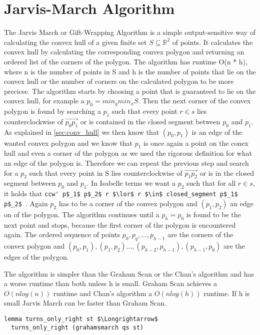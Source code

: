 




\section{Jarvis-March Algorithm}
The Jarvis March or Gift-Wrapping Algorithm is a simple output-sensitive way of calculating
the convex hull of a given finite set $S \subseteq \mathbb{R}^2$ of points. It calculates the
convex hull by calculating the corresponding convex polygon and returning
an ordered list of the corners of the polygon. The algorithm has runtime O(n * h), where n 
is the number of points in S and h is the number of points that lie on the convex hull or
the number of corners on the calculated polygon to be more precicse. 
The algorithm starts by choosing a point that is guaranteed to lie on the convex hull, 
for example a $p_0 = min_y min_x S$. Then the next corner of the convex polygon
is found by searching a $p_1$ such that every point $r \in s$ lies counterclockwise
of $\vec{p_0 p_1}$ or is contained in the closed segment between $p_0$ and $p_1$. 
As explained in \ref{sec:conv_hull} we then know that $(p_0,p_1)$ is 
an edge of the wanted convex polygon and we know that $p_1$ is once again a point on
the conex hull and even a corner of the polygon as we used the rigorous definition for
what an edge of the polygon is. Therefore we can repeat the previous step
and search for a $p_2$ such that every point in S lies counterclockwise of $\vec{p_1 p_2}$
or is in the closed segment between $p_0$ and $p_1$. In Isabelle terms we want a $p_2$
such that for all $r \in s$, it holds that 
\lstinline|ccw' p$_1$ p$_2$ r $\lor$ r $\in$ closed_segment p$_1$ p$_2$ |.
Again $p_2$ has to be a corner of the convex polygon and $(p_1,p_2)$ an edge on of the
polygon. The algorithm continues until a $p_h = p_0$ is found to be the next point and
stops, because the first corner of the polygon is encountered again. 
The ordered sequence of points $p_0,p_q, ... , p_{h-1}$ are the corners of the convex polygon 
and $(p_0,p_1),(p_1,p_2) ... ,(p_{h-2},p_{h-1}), (p_{h-1},p_0)$ are the edges of the polygon.

The algorithm is simpler than the Graham Scan or the Chan's algorithm and has a worse
runtime than both unless h is small. Graham Scan achieves a $O(n log(n))$ runtime and 
Chan's algorithm a $O(n log(h))$ runtime. If h is small Jarvis March 
can be faster than Graham Scan.
\begin{lstlisting}[language=isabelle]
  lemma turns_only_right st $\Longrightarrow$
  turns_only_right (grahamsmarch qs st)
\end{lstlisting}
  

